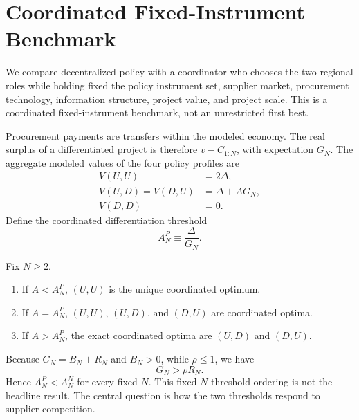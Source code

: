 \section{Coordinated Fixed-Instrument Benchmark}
\label{sec:planner}

We compare decentralized policy with a coordinator who chooses the two regional roles while holding fixed the policy instrument set, supplier market, procurement technology, information structure, project value, and project scale. This is a coordinated fixed-instrument benchmark, not an unrestricted first best.

Procurement payments are transfers within the modeled economy. The real surplus of a differentiated project is therefore $v-C_{1:N}$, with expectation $G_N$. The aggregate modeled values of the four policy profiles are
\begin{align}
V(U,U)&=2\Delta,\label{eq:planner-UU}\\
V(U,D)=V(D,U)&=\Delta+A G_N,\label{eq:planner-UD}\\
V(D,D)&=0.\label{eq:planner-DD}
\end{align}
Define the coordinated differentiation threshold
\begin{equation}
A_N^P\equiv \frac{\Delta}{G_N}.
\label{eq:AP-main}
\end{equation}

\begin{proposition}
\label{prop:planner}
Fix $N\ge2$.
\begin{enumerate}[label=(\roman*)]
\item If $A<A_N^P$, $(U,U)$ is the unique coordinated optimum.
\item If $A=A_N^P$, $(U,U)$, $(U,D)$, and $(D,U)$ are coordinated optima.
\item If $A>A_N^P$, the exact coordinated optima are $(U,D)$ and $(D,U)$.
\end{enumerate}
\end{proposition}

Because $G_N=B_N+R_N$ and $B_N>0$, while $\rho\le1$, we have
\begin{equation}
G_N>\rho R_N.
\label{eq:capture-gap}
\end{equation}
Hence $A_N^P<A_N^N$ for every fixed $N$. This fixed-$N$ threshold ordering is not the headline result. The central question is how the two thresholds respond to supplier competition.
